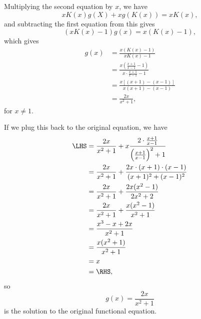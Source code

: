 \begin{enumerate}
          Multiplying the second equation by \(x\), we have
          \[
              xK(x) g(X) + x g(K(x)) = x K(x),
          \]
          and subtracting the first equation from this gives
          \[
              (x K(x) - 1) g(x) = x (K(x) - 1),
          \]
          which gives
          \begin{align*}
              g(x) & = \frac{x \left(K(x) - 1\right)}{x K(x) - 1}                                     \\
                   & = \frac{x \left(\frac{x + 1}{x - 1} - 1\right)}{x \cdot \frac{x + 1}{x - 1} - 1} \\
                   & = \frac{x \left[(x + 1) - (x - 1)\right]}{x (x + 1) - (x - 1)}                   \\
                   & = \frac{2x}{x^2 + 1},
          \end{align*}
          for \(x \neq 1\).

          If we plug this back to the original equation, we have
          \begin{align*}
              \LHS & = \frac{2x}{x^2 + 1} + x \frac{2 \cdot \frac{x + 1}{x - 1}}{\left(\frac{x + 1}{x - 1}\right)^2 + 1} \\
                   & = \frac{2x}{x^2 + 1} + \frac{2x \cdot (x + 1) \cdot (x - 1)}{(x + 1)^2 + (x - 1)^2}                 \\
                   & = \frac{2x}{x^2 + 1} + \frac{2x(x^2 - 1)}{2x^2 + 2}                                                 \\
                   & = \frac{2x}{x^2 + 1} + \frac{x(x^2 - 1)}{x^2 + 1}                                                   \\
                   & = \frac{x^3 - x + 2x}{x^2 + 1}                                                                      \\
                   & = \frac{x(x^2 + 1)}{x^2 + 1}                                                                        \\
                   & = x                                                                                                 \\
                   & = \RHS,
          \end{align*}
          so
          \[
              g(x) = \frac{2x}{x^2 + 1}
          \]
          is the solution to the original functional equation.


\end{enumerate}
